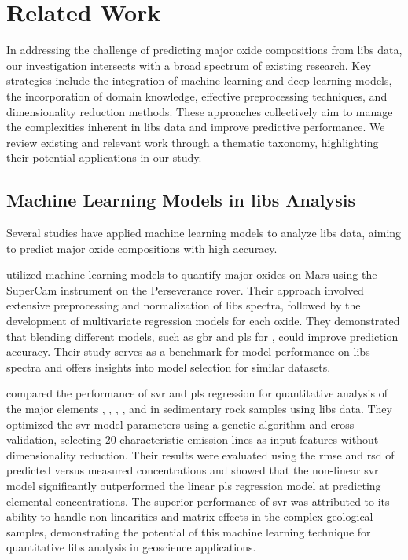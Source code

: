 \section{Related Work}\label{sec:related-work}
In addressing the challenge of predicting major oxide compositions from \gls{libs} data, our investigation intersects with a broad spectrum of existing research.
Key strategies include the integration of machine learning and deep learning models, the incorporation of domain knowledge, effective preprocessing techniques, and dimensionality reduction methods.
These approaches collectively aim to manage the complexities inherent in \gls{libs} data and improve predictive performance.
We review existing and relevant work through a thematic taxonomy, highlighting their potential applications in our study.

\subsection{Machine Learning Models in \gls{libs} Analysis}
Several studies have applied machine learning models to analyze \gls{libs} data, aiming to predict major oxide compositions with high accuracy.

\citet{andersonPostlandingMajorElement2022} utilized machine learning models to quantify major oxides on Mars using the SuperCam instrument on the Perseverance rover.
Their approach involved extensive preprocessing and normalization of \gls{libs} spectra, followed by the development of multivariate regression models for each oxide.
They demonstrated that blending different models, such as \gls{gbr} and \gls{pls} for , could improve prediction accuracy.
Their study serves as a benchmark for model performance on \gls{libs} spectra and offers insights into model selection for similar datasets.

\citet{shi_svr_libs_2015} compared the performance of \gls{svr} and \gls{pls} regression for quantitative analysis of the major elements , , , , and  in sedimentary rock samples using \gls{libs} data.
They optimized the \gls{svr} model parameters using a genetic algorithm and cross-validation, selecting 20 characteristic emission lines as input features without dimensionality reduction.
Their results were evaluated using the \gls{rmse} and \gls{rsd} of predicted versus measured concentrations and showed that the non-linear \gls{svr} model significantly outperformed the linear \gls{pls} regression model at predicting elemental concentrations.
The superior performance of \gls{svr} was attributed to its ability to handle non-linearities and matrix effects in the complex geological samples, demonstrating the potential of this machine learning technique for quantitative \gls{libs} analysis in geoscience applications.

